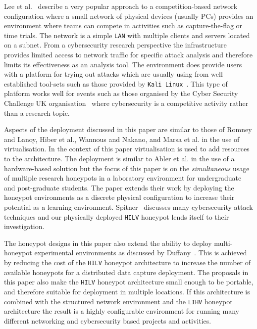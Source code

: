 \documentclass{ieeeaccess}
\begin{document}
Lee et al.~\cite{LUFC:11} describe a very popular approach to a
competition-based network configuration where a small network of physical
devices (usually PCs) provides an environment where teams can compete in
activities such as capture-the-flag or time trials. The network is a simple
\texttt{LAN} with multiple clients and servers located on a subnet. From a
cybersecurity research perspective the infrastructure provides limited access
to network traffic for specific attack analysis and therefore limits its
effectiveness as an analysis tool. The environment does provide users with a
platform for trying out attacks which are usually using from well established
tool-sets such as those provided by \texttt{Kali Linux}~\cite{OS:17}. This type
of platform works well for events such as those organised by the Cyber Security
Challenge UK organisation~\cite{CSCUK:18} where cybersecurity is a competitive
activity rather than a research topic.   

Aspects of the deployment discussed in this paper are similar to those of
Romney and Lanoy, Hiber et al., Wannous and Nakano, and Marsa et al. in the use
of virtualisation. In the context of this paper virtualisation is used to add
resources to the architecture. The deployment is similar to Abler et al. in the
use of a hardware-based solution but the focus of this paper is on the
\textit{simultaneous} usage of multiple research honeypots in a laboratory
environment for undergraduate and post-graduate students. The paper extends
their work by deploying the honeypot environments as a discrete physical
configuration to increase their potential as a learning environment.
Spitner~\cite{LS:03} discusses many cybersecurity attack techniques and our
physically deployed \texttt{HILV} honeypot lends itself to their investigation. 

The honeypot designs in this paper also extend the ability to deploy
multi-honeypot experimental environments as discussed by Duffany~\cite{JD:08}.
This is achieved by reducing the cost of the \texttt{HILV} honeypot
architecture to increase the number of available honeypots for a distributed
data capture deployment. The proposals in this paper also make the
\texttt{HILV} honeypot architecture small enough to be portable, and therefore
suitable for deployment in multiple locations. If this architecture is combined
with the structured network environment and the \texttt{LIHV} honeypot
architecture the result is a highly configurable environment for running many
different networking and cybersecurity based projects and activities.
\end{document}
